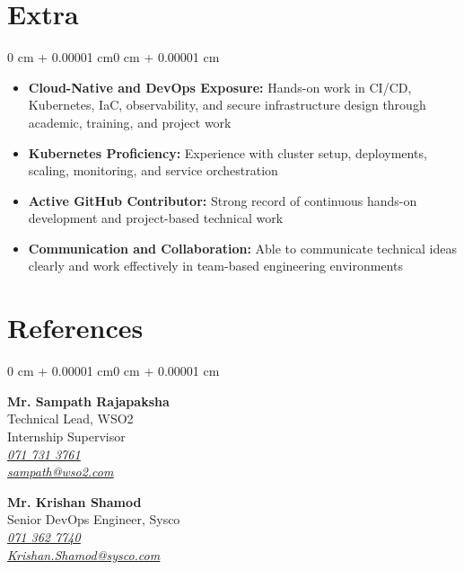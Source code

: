 \documentclass[10pt, letterpaper]{article}
\let\oldhref\href
\renewcommand{\href}[2]{\oldhref{#1}{\textit{\underline{#2}}}}
\newenvironment{highlightsforbulletentries}{
    \begin{itemize}[
        topsep=0.10 cm,
        parsep=0.10 cm,
        partopsep=0pt,
        itemsep=0pt,
        leftmargin=10pt
    ]
}{
    \end{itemize}
}
\newenvironment{onecolentry}{
    \begin{adjustwidth}{0 cm + 0.00001 cm}{0 cm + 0.00001 cm}
}{
    \end{adjustwidth}
}
\begin{document}
    \section{Extra}
    \begin{onecolentry}
        \begin{highlightsforbulletentries}
            \item \textbf{Cloud-Native and DevOps Exposure:} Hands-on work in CI/CD, Kubernetes, IaC, observability, and secure infrastructure design through academic, training, and project work
            \item \textbf{Kubernetes Proficiency:} Experience with cluster setup, deployments, scaling, monitoring, and service orchestration
            \item \textbf{Active GitHub Contributor:} Strong record of continuous hands-on development and project-based technical work
            \item \textbf{Communication and Collaboration:} Able to communicate technical ideas clearly and work effectively in team-based engineering environments
        \end{highlightsforbulletentries}
    \end{onecolentry}

    \section{References}
    \begin{onecolentry}
        \begin{minipage}[t]{0.48\textwidth}
            \textbf{Mr. Sampath Rajapaksha} \\
            Technical Lead, WSO2 \\
            Internship Supervisor \\
            \href{tel:+94-71-731-3761}{071 731 3761} \\
            \href{mailto:sampath@wso2.com}{sampath@wso2.com}
        \end{minipage}%
        \hfill
        \begin{minipage}[t]{0.48\textwidth}
            \textbf{Mr. Krishan Shamod} \\
            Senior DevOps Engineer, Sysco \\
            \href{tel:+94-71-362-7740}{071 362 7740} \\
            \href{mailto:Krishan.Shamod@sysco.com}{Krishan.Shamod@sysco.com}
        \end{minipage}
    \end{onecolentry}
\end{document}
